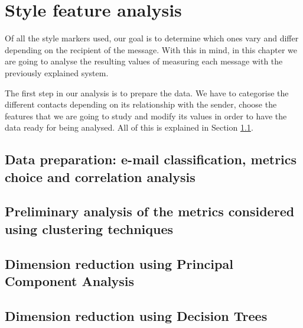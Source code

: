 \chapter{Style feature analysis}


Of all the style markers used, our goal is to determine which ones vary and differ depending on the recipient of the message. With this in mind, in this chapter we are going to analyse the resulting values of measuring each message with the previously explained system.

The first step in our analysis is to prepare the data. We have to categorise the different contacts depending on its relationship with the sender, choose the features that we are going to study and modify its values in order to have the data ready for being analysed. All of this is explained in Section \ref{sect:DatPrep}.

\section{Data preparation: e-mail classification, metrics choice and correlation analysis}\label{sect:DatPrep}


\section{Preliminary analysis of the metrics considered using clustering techniques}\label{sect:clust1}


\section{Dimension reduction using Principal Component Analysis}\label{sect:pca}


\section{Dimension reduction using Decision Trees}\label{sect:dectrees}
